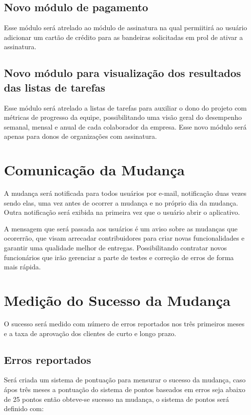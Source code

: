 \subsection*{Novo módulo de pagamento}
Esse módulo será atrelado ao módulo de assinatura na qual permiitirá ao usuário adicionar um cartão de crédito para as bandeiras solicitadas em prol de ativar a assinatura.

\subsection*{Novo módulo para visualização dos resultados das listas de tarefas}
Esse módulo será atrelado a listas de tarefas para auxiliar o dono do projeto com métricas de progresso da equipe, possibilitando uma visão geral do desempenho semanal, mensal e anual de cada colaborador da empresa.
 Esse novo módulo será apenas para donos de organizações com assinatura.

\section*{Comunicação da Mudança}
A mudança será notificada para todos usuários por e-mail, notificação duas vezes sendo elas, uma vez antes de ocorrer a mudança e no próprio dia da mudança. Outra notificação será exibida na primeira vez que o usuário abrir o aplicativo. 

A mensagem que será passada aos usuários é um aviso sobre as mudanças que ocorerrão, que visam arrecadar contribuidores para criar novas funcionalidades e garantir uma qualidade melhor de entregas. Possibilitando contratar novos funcionários que irão gerenciar a parte de testes e correção de erros de forma mais rápida.

\section*{Medição do Sucesso da Mudança}
O sucesso será medido com número de erros reportados nos três primeiros meses e a taxa de aprovação dos clientes de curto e longo prazo. 

\subsection*{Erros reportados}
Será criada um sistema de pontuação para mensurar o sucesso da mudança, caso ápos três meses a pontuação do sistema de pontos baseados em erros seja abaixo de 25  pontos então obteve-se sucesso na mudança, o sistema de pontos será definido com: 
